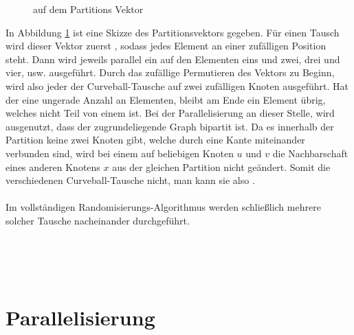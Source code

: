 \begin{figure}[h]
\centering
  \caption{\gc auf dem Partitions Vektor}
  \label{fig:global_curveball_trade_vector}
  
\end{figure}
%
%
%
In Abbildung \ref{fig:global_curveball_trade_vector} ist eine Skizze des Partitionsvektors gegeben.
Für einen \gc Tausch wird dieser Vektor zuerst , sodass jedes Element an einer zufälligen
Position steht. Dann wird jeweils parallel ein \ct auf den Elementen eins und zwei, drei und vier, usw. ausgeführt.
Durch das zufällige Permutieren des Vektors zu Beginn, wird also jeder der Curveball-Tausche auf zwei zufälligen
Knoten ausgeführt. Hat der \partvek eine ungerade Anzahl an Elementen, bleibt am Ende ein Element übrig, 
welches nicht Teil von einem \ct ist. Bei der Parallelisierung an dieser Stelle, wird ausgenutzt, dass 
der zugrundeliegende Graph bipartit ist. Da es innerhalb der Partition keine zwei Knoten gibt, welche  
durch eine Kante miteinander verbunden sind, wird bei einem \ct auf beliebigen Knoten $u$ und $v$ 
die Nachbarschaft eines anderen Knotens $x$  aus der gleichen Partition nicht geändert. Somit
 die verschiedenen Curveball-Tausche nicht, man kann sie also . 
\\
\\
Im vollständigen Randomisierungs-Algorithmus werden schließlich mehrere solcher \gc Tausche nacheinander
durchgeführt.



~\\
\\
\\











\section{Parallelisierung}

